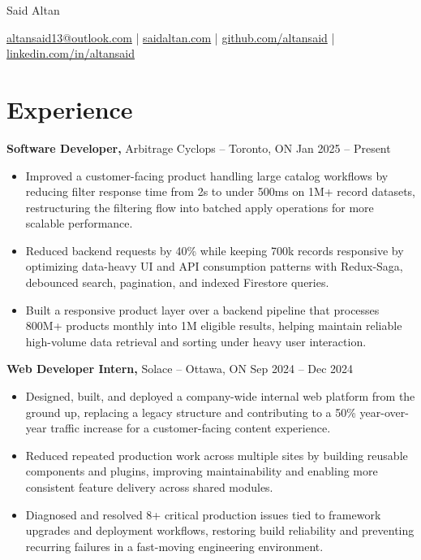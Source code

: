 \documentclass[11pt]{article}       %
\begin{document}
\centerline{\Huge Said Altan}

\vspace{10pt}

\centerline{\href{mailto:altansaid13@outlook.com}{altansaid13@outlook.com} | \href{https://saidaltan.com}{saidaltan.com} | \href{https://github.com/altansaid}{github.com/altansaid} | \href{https://www.linkedin.com/in/altansaid}{linkedin.com/in/altansaid}}


\vspace{5pt}
\section*{Experience}
\textbf{Software Developer,} {Arbitrage Cyclops} -- Toronto, ON \hfill Jan 2025 -- Present \\
\vspace{-9pt}
\begin{itemize}
  \item Improved a customer-facing product handling large catalog workflows by reducing filter response time from 2s to under 500ms on 1M+ record datasets, restructuring the filtering flow into batched apply operations for more scalable performance.
  \item Reduced backend requests by 40\% while keeping 700k records responsive by optimizing data-heavy UI and API consumption patterns with Redux-Saga, debounced search, pagination, and indexed Firestore queries.
  \item Built a responsive product layer over a backend pipeline that processes 800M+ products monthly into 1M eligible results, helping maintain reliable high-volume data retrieval and sorting under heavy user interaction.
\end{itemize}

\textbf{Web Developer Intern,} {Solace} -- Ottawa, ON \hfill Sep 2024 -- Dec 2024 \\
\vspace{-9pt}
\begin{itemize}
  \item Designed, built, and deployed a company-wide internal web platform from the ground up, replacing a legacy structure and contributing to a 50\% year-over-year traffic increase for a customer-facing content experience.
  \item Reduced repeated production work across multiple sites by building reusable components and plugins, improving maintainability and enabling more consistent feature delivery across shared modules.
  \item Diagnosed and resolved 8+ critical production issues tied to framework upgrades and deployment workflows, restoring build reliability and preventing recurring failures in a fast-moving engineering environment.
\end{itemize}
\end{document}
